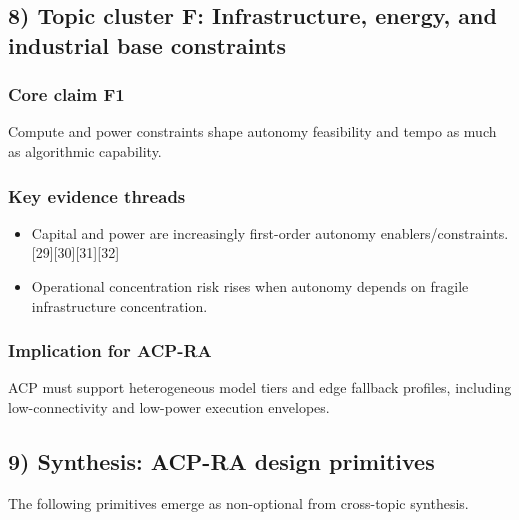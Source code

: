 \documentclass[11pt]{article}
\begin{document}
\hypertarget{topic-cluster-f-infrastructure-energy-and-industrial-base-constraints}{%
\subsection{8) Topic cluster F: Infrastructure, energy, and industrial
base
constraints}\label{topic-cluster-f-infrastructure-energy-and-industrial-base-constraints}}

\hypertarget{core-claim-f1}{%
\subsubsection{Core claim F1}\label{core-claim-f1}}

Compute and power constraints shape autonomy feasibility and tempo as
much as algorithmic capability.

\hypertarget{key-evidence-threads-5}{%
\subsubsection{Key evidence threads}\label{key-evidence-threads-5}}

\begin{itemize}
\tightlist
\item
  Capital and power are increasingly first-order autonomy
  enablers/constraints. {[}29{]}{[}30{]}{[}31{]}{[}32{]}
\item
  Operational concentration risk rises when autonomy depends on fragile
  infrastructure concentration.
\end{itemize}

\hypertarget{implication-for-acp-ra-5}{%
\subsubsection{Implication for ACP-RA}\label{implication-for-acp-ra-5}}

ACP must support heterogeneous model tiers and edge fallback profiles,
including low-connectivity and low-power execution envelopes.

\hypertarget{synthesis-acp-ra-design-primitives}{%
\subsection{9) Synthesis: ACP-RA design
primitives}\label{synthesis-acp-ra-design-primitives}}

The following primitives emerge as non-optional from cross-topic
synthesis.
\end{document}
